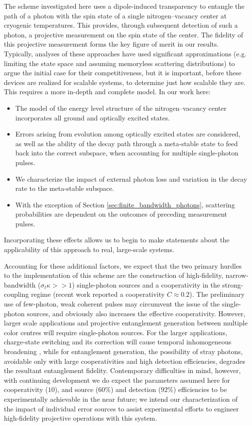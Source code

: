 \documentclass[aps,pra,amsmath,amssymb,reprint,superscriptaddress,tightenlines]{revtex4-1}
\begin{document}
The scheme investigated here uses a dipole-induced transparency to entangle the path of a photon with the spin state of a single nitrogen--vacancy center at cryogenic temperatures. This provides, through subsequent detection of such a photon, a projective measurement on the spin state of the center. The fidelity of this projective measurement forms the key figure of merit in our results. Typically, analyses of these approaches have used significant approximations (e.g. limiting the state space and assuming memoryless scattering distributions) to argue the initial case for their competitiveness, but it is important, before these devices are realized for scalable systems, to determine just how scalable they are. This requires a more in-depth and complete model. In our work here:
\begin{itemize}
	\item The model of the energy level structure of the nitrogen--vacancy center incorporates all ground and optically excited states.
	\item Errors arising from evolution among optically excited states are considered, as well as the ability of the decay path through a meta-stable state to feed back into the correct subspace, when accounting for multiple single-photon pulses.
	\item We characterize the impact of external photon loss and variation in the decay rate to the meta-stable subspace.
	\item With the exception of Section \ref{sec:finite_bandwidth_photons}, scattering probabilities are dependent on the outcomes of preceding measurement pulses.
\end{itemize}
Incorporating these effects allows us to begin to make statements about the applicability of this approach to real, large-scale systems.



Accounting for these additional factors, we expect that the two primary hurdles to the implementation of this scheme are the construction of high-fidelity, narrow-bandwidth ($\sigma_{t}\kappa>>1$) single-photon sources and a cooperativity in the strong-coupling regime (recent work \cite{Janitz15} reported a cooperativity $C\approx 0.2$). The preliminary use of few-photon, weak coherent pulses may circumvent the issue of the single-photon sources, and obviously also increases the effective cooperativity. However, larger scale applications and projective entanglement generation between multiple color centres will require single-photon sources. For the larger applications, charge-state switching and its correction will cause temporal inhomogeneous broadening \cite{Robledo10}, while for entanglement generation, the possibility of stray photons, avoidable only with large cooperativities and high detection efficiencies, degrades the resultant entanglement fidelity. Contemporary difficulties in mind, however, with continuing development we do expect the parameters assumed here for cooperativity ($10$), and source ($60$\%) and detection ($92$\%) efficiencies to be experimentally achievable in the near future; we intend our characterization of the impact of individual error sources to assist experimental efforts to engineer high-fidelity projective operations with this system.
\end{document}

